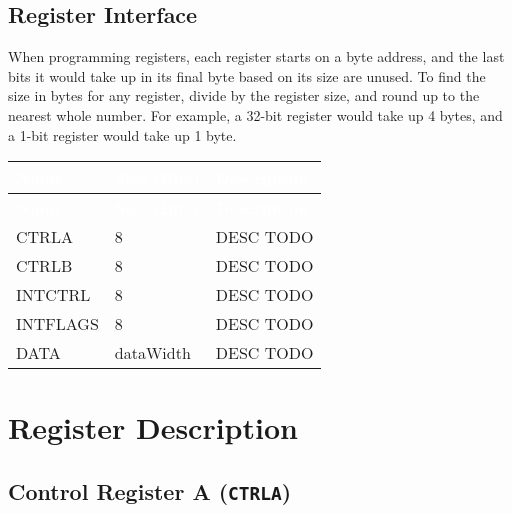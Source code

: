 \subsection{Register Interface}
 
When programming registers, each register starts on a byte address, and the last bits it would take up in its final byte based on its size are unused. To find the size in bytes for any register, divide by the register size, and round up to the nearest whole number. For example, a 32-bit register would take up 4 bytes, and a 1-bit register would take up 1 byte.
\renewcommand*{\arraystretch}{1.4}
\begingroup
\small
{} %
\begin{longtable}[H]{
  | p{}
  | p{}
  | p{} |
  }
  \hline
  \rowcolor{dark-gray}

  \textcolor{white}{\textbf{Name}} &   
  \textcolor{white}{\textbf{Size (Bits)}} &   
  \textcolor{white}{\textbf{Description}} \\ \hline \hline
  \endfirsthead

  \textcolor{white}{\textbf{Name}} &   
  \textcolor{white}{\textbf{Size (Bits)}} &   
  \textcolor{white}{\textbf{Description}} \\ \hline \hline
  \endhead

  
  CTRLA  &   
  8 &   
  DESC TODO \\ \hline

  CTRLB &   
  8 &   
  DESC TODO \\ \hline

  INTCTRL &   
  8 &   
  DESC TODO \\ \hline

  INTFLAGS &   
  8 &   
  DESC TODO \\ \hline

  DATA&   
  dataWidth &   
  DESC TODO \\ \hline

\end{longtable}
\captionsetup{aboveskip=0pt}
\label{table:register}

  \newpage

  \section{Register Description}

  \subsection{Control Register A (\texttt{CTRLA})}
  \label{sec:ctrla}
  
